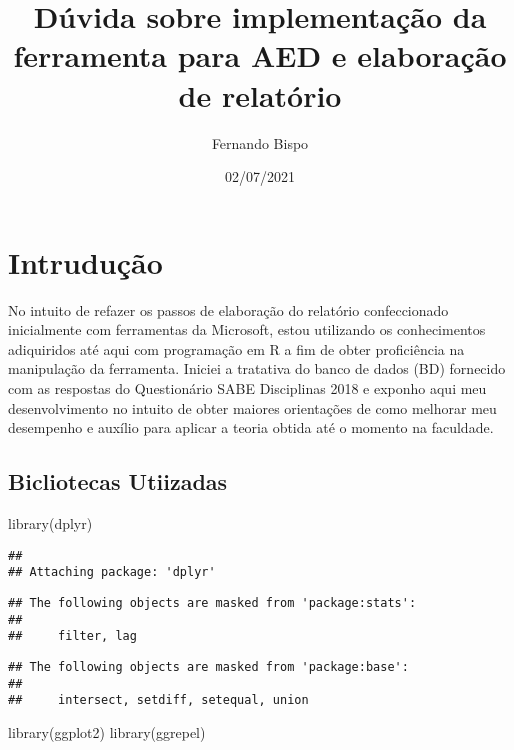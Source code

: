 \documentclass[
]{article}
\title{Dúvida sobre implementação da ferramenta para AED e elaboração de
relatório}
\author{Fernando Bispo}
\date{02/07/2021}
\newenvironment{Shaded}{\begin{snugshade}}{\end{snugshade}}
\newcommand{\FunctionTok}[1]{\textcolor[rgb]{0.00,0.00,0.00}{#1}}
\newcommand{\NormalTok}[1]{#1}
\begin{document}
\maketitle

\hypertarget{intruduuxe7uxe3o}{%
\section{Intrudução}\label{intruduuxe7uxe3o}}

No intuito de refazer os passos de elaboração do relatório confeccionado
inicialmente com ferramentas da Microsoft, estou utilizando os
conhecimentos adiquiridos até aqui com programação em R a fim de obter
proficiência na manipulação da ferramenta. Iniciei a tratativa do banco
de dados (BD) fornecido com as respostas do Questionário SABE
Disciplinas 2018 e exponho aqui meu desenvolvimento no intuito de obter
maiores orientações de como melhorar meu desempenho e auxílio para
aplicar a teoria obtida até o momento na faculdade.

\hypertarget{bicliotecas-utiizadas}{%
\subsection{Bicliotecas Utiizadas}\label{bicliotecas-utiizadas}}

\begin{Shaded}
\begin{Highlighting}[]
\FunctionTok{library}\NormalTok{(dplyr)  }
\end{Highlighting}
\end{Shaded}

\begin{verbatim}
## 
## Attaching package: 'dplyr'
\end{verbatim}

\begin{verbatim}
## The following objects are masked from 'package:stats':
## 
##     filter, lag
\end{verbatim}

\begin{verbatim}
## The following objects are masked from 'package:base':
## 
##     intersect, setdiff, setequal, union
\end{verbatim}

\begin{Shaded}
\begin{Highlighting}[]
\FunctionTok{library}\NormalTok{(ggplot2)  }
\FunctionTok{library}\NormalTok{(ggrepel)  }
\end{Highlighting}
\end{Shaded}
\end{document}
